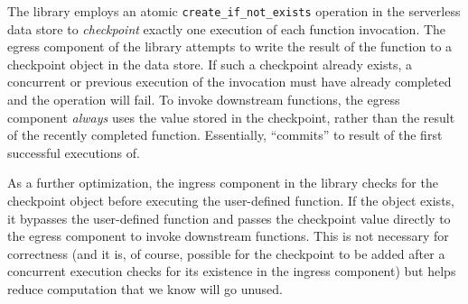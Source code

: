 The \name{} library employs an atomic \texttt{create\_if\_not\_exists}
operation in the serverless data store to \emph{checkpoint} exactly one
execution of each function invocation. The egress component of the \name{}
library attempts to write the result of the function to a checkpoint object in
the data store. If such a checkpoint already exists, a concurrent or previous
execution of the invocation must have already completed and the operation will
fail. To invoke downstream functions, the egress component \emph{always} uses
the value stored in the checkpoint, rather than the result of the recently
completed function. Essentially, \name{} ``commits'' to result of the first
successful executions of.


As a further optimization, the ingress component in the \name{} library checks
for the checkpoint object before executing the user-defined function. If the
object exists, it bypasses the user-defined function and passes the checkpoint
value directly to the egress component to invoke downstream functions. This is
not necessary for correctness (and it is, of course, possible for the checkpoint
to be added after a concurrent execution checks for its existence in the ingress
component) but helps reduce computation that we know will go unused.





